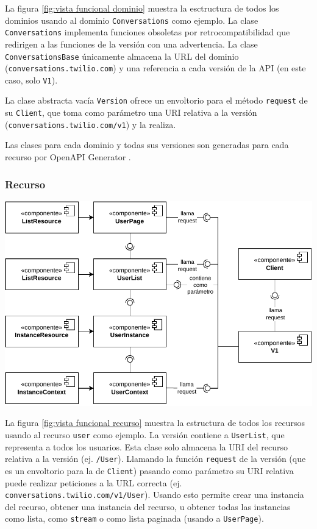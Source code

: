 \documentclass{article}
\begin{document}
\hfill

La figura \ref{fig:vista funcional dominio}
muestra la esctructura de todos los dominios
usando al dominio \verb|Conversations| como ejemplo.
La clase \verb|Conversations| implementa funciones obsoletas por retrocompatibilidad
que redirigen a las funciones de la versión con una advertencia.
La clase \verb|ConversationsBase| únicamente almacena la URL del dominio
(\verb|conversations.twilio.com|)
y una referencia a cada versión de la API
(en este caso, solo \verb|V1|).

La clase abstracta vacía \verb|Version|
ofrece un envoltorio para el método \verb|request| de su \verb|Client|,
que toma como parámetro una URI relativa a la versión
(\verb|conversations.twilio.com/v1|)
y la realiza.

Las clases para cada dominio y todas sus versiones
son generadas para cada recurso por OpenAPI Generator
\cite{twilio-generated-openapi}.

\subsubsection{Recurso}

\hfill

\begin{center}
  \includegraphics[width=\textwidth]{VistaFuncionalRecurso.pdf}
  \label{fig:vista funcional recurso}
\end{center}

\hfill

La figura \ref{fig:vista funcional recurso}
muestra la estructura de todos los recursos
usando al recurso \verb|user| como ejemplo.
La versión contiene a \verb|UserList|,
que representa a todos los usuarios.
Esta clase solo almacena la URI del recurso relativa a la versión
(ej. \verb|/User|).
Llamando la función \verb|request| de la versión
(que es un envoltorio para la de \verb|Client|)
pasando como parámetro su URI relativa
puede realizar peticiones a la URL correcta
(ej. \verb|conversations.twilio.com/v1/User|).
Usando esto permite crear una instancia del recurso,
obtener una instancia del recurso,
u obtener todas las instancias
como lista, como \verb|stream| o como lista paginada
(usando a \verb|UserPage|).
\end{document}
